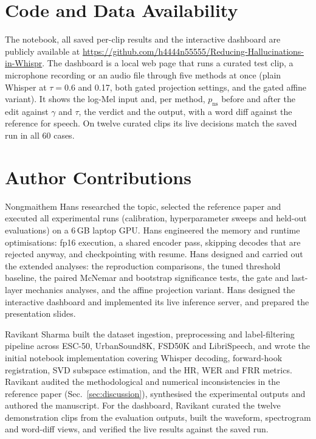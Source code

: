 \documentclass[conference,a4paper]{IEEEtran}
\newcommand{\pns}{p_{\mathrm{ns}}}
\newcommand{\repo}{\url{https://github.com/h4444n55555/Reducing-Hallucinations-in-Whispr}}
\begin{document}
\section*{Code and Data Availability}

The notebook, all saved per-clip results and the interactive dashboard are publicly available at \repo. The dashboard is a local web page that runs a curated test clip, a microphone recording or an audio file through five methods at once (plain Whisper at $\tau = 0.6$ and 0.17, both gated projection settings, and the gated affine variant). It shows the log-Mel input and, per method, $\pns$ before and after the edit against $\gamma$ and $\tau$, the verdict and the output, with a word diff against the reference for speech. On twelve curated clips its live decisions match the saved run in all 60 cases.

\section*{Author Contributions}

Nongmaithem Hans researched the topic, selected the reference paper and executed all experimental runs (calibration, hyperparameter sweeps and held-out evaluations) on a 6\,GB laptop GPU. Hans engineered the memory and runtime optimisations: fp16 execution, a shared encoder pass, skipping decodes that are rejected anyway, and checkpointing with resume. Hans designed and carried out the extended analyses: the reproduction comparisons, the tuned threshold baseline, the paired McNemar and bootstrap significance tests, the gate and last-layer mechanics analyses, and the affine projection variant. Hans designed the interactive dashboard and implemented its live inference server, and prepared the presentation slides.

Ravikant Sharma built the dataset ingestion, preprocessing and label-filtering pipeline across ESC-50, UrbanSound8K, FSD50K and LibriSpeech, and wrote the initial notebook implementation covering Whisper decoding, forward-hook registration, SVD subspace estimation, and the HR, WER and FRR metrics. Ravikant audited the methodological and numerical inconsistencies in the reference paper (Sec.~\ref{sec:discussion}), synthesised the experimental outputs and authored the manuscript. For the dashboard, Ravikant curated the twelve demonstration clips from the evaluation outputs, built the waveform, spectrogram and word-diff views, and verified the live results against the saved run.
\end{document}
